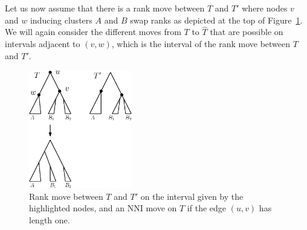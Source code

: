 \documentclass{amsart}
\newcommand{\nni}{\mathrm{NNI}}
\begin{document}
Let us now assume that there is a rank move between $T$ and $T'$ where nodes $v$ and $w$ inducing clusters $A$ and $B$ swap ranks as depicted at the top of Figure~\ref{fig:thm_fp_rank1}.
We will again consider the different moves from $T$ to $\hat T$ that are possible on intervals adjacent to $(v,w)$, which is the interval of the rank move between $T$ and $T'$.


\begin{figure}[!hbt]
\centering
\includegraphics[width=0.4\textwidth]{thm_fp_rank1}
\vspace{12pt}
\caption{Rank move between $T$ and $T'$ on the interval given by the highlighted nodes, and an $\nni$ move on $T$ if the edge $(u,v)$ has length one.}
\label{fig:thm_fp_rank1}
\end{figure}
\end{document}
